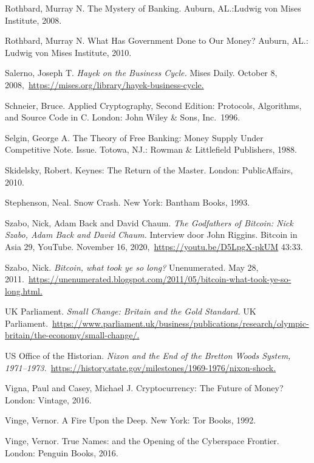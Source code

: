 \documentclass[smalldemyvopaper,11pt,twoside,onecolumn,openright,extrafontsizes,hidelinks]{memoir}
\begin{document}
Rothbard, Murray N. The Mystery of Banking. Auburn, AL.:Ludwig von Mises
Institute, 2008.

Rothbard, Murray N. What Has Government Done to Our Money? Auburn, AL.:
Ludwig von Mises Institute, 2010.

Salerno, Joseph T. \emph{Hayek on the Business Cycle.} Mises Daily.
October 8,
2008,~\href{https://mises.org/library/hayek-business-cycle}{https://mises.org/library/hayek-business-cycle.}

Schneier, Bruce. Applied Cryptography, Second Edition: Protocols,
Algorithms, and Source Code in C. London: John Wiley \& Sons, Inc.~1996.

Selgin, George A. The Theory of Free Banking: Money Supply Under
Competitive Note. Issue. Totowa, NJ.: Rowman \& Littlefield Publishers,
1988.

Skidelsky, Robert. Keynes: The Return of the Master. London:
PublicAffairs, 2010.

Stephenson, Neal. Snow Crash. New York: Bantham Books, 1993.

Szabo, Nick, Adam Back and David Chaum. \emph{The Godfathers of Bitcoin:
Nick Szabo, Adam Back and David Chaum.} Interview door John Riggins.
Bitcoin in Asia 29, YouTube. November 16,
2020,~\url{https://youtu.be/D5LpgX-pkUM} 43:33.

Szabo, Nick. \emph{Bitcoin, what took ye so long?} Unenumerated. May 28,
2011.~\href{https://unenumerated.blogspot.com/2011/05/bitcoin-what-took-ye-so-long.html}{https://unenumerated.blogspot.com/2011/05/bitcoin-what-took-ye-so-long.html.}

UK Parliament. \emph{Small Change: Britain and the Gold Standard.} UK
Parliament.~\href{https://www.parliament.uk/business/publications/research/olympic-britain/the-economy/small-change/}{https://www.parliament.uk/business/publications/research/olympic-britain/the-economy/small-change/.}

US Office of the Historian. \emph{Nixon and the End of the Bretton Woods
System,
1971--1973.}~\href{https://history.state.gov/milestones/1969-1976/nixon-shock}{https://history.state.gov/milestones/1969-1976/nixon-shock.}

Vigna, Paul and Casey, Michael J. Cryptocurrency: The Future of Money?
London: Vintage, 2016.

Vinge, Vernor. A Fire Upon the Deep. New York: Tor Books, 1992.

Vinge, Vernor. True Names: and the Opening of the Cyberspace Frontier.
London: Penguin Books, 2016.
\end{document}
